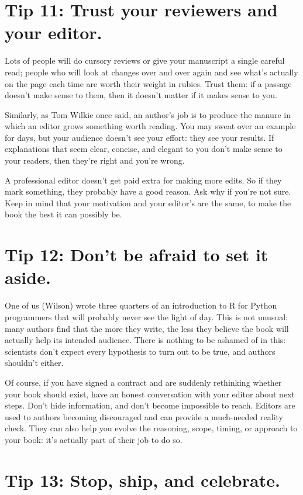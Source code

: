 \documentclass[10pt,letterpaper]{article}
\begin{document}
\section*{Tip 11: Trust your reviewers and your editor.}

Lots of people will do cursory reviews
or give your manuscript a single careful read;
people who will look at changes over and over again
and see what's actually on the page each time
are worth their weight in rubies.
Trust them:
if a passage doesn't make sense to them,
then it doesn't matter if it makes sense to you.

Similarly,
as Tom Wilkie once said,
an author's job is to produce the manure in which an editor grows something worth reading.
You may sweat over an example for days,
but your audience doesn't see your effort:
they see your results.
If explanations that seem clear, concise, and elegant to you don't make sense to your readers,
then they're right and you're wrong.

A professional editor doesn't get paid extra for making more edits. So if they mark something,
they probably have a good reason. Ask why if you're not sure. Keep in mind that
your motivation and your editor's are the same, to make
the book the best it can possibly be.

\section*{Tip 12: Don't be afraid to set it aside.}

One of us (Wilson) wrote three quarters of an introduction to R for Python programmers
that will probably never see the light of day.
This is not unusual:
many authors find that the more they write,
the less they believe the book will actually help its intended audience.
There is nothing to be ashamed of in this:
scientists don't expect every hypothesis to turn out to be true,
and authors shouldn't either.

Of course,
if you have signed a contract and are suddenly rethinking whether your book should exist,
have an honest conversation with your editor about next steps.
Don't hide information,
and don't become impossible to reach.
Editors are used to authors becoming discouraged
and can provide a much-needed reality check.
They can also help you evolve the reasoning, scope, timing, or approach to your book:
it's actually part of their job to do so.

\section*{Tip 13: Stop, ship, and celebrate.}
\end{document}
